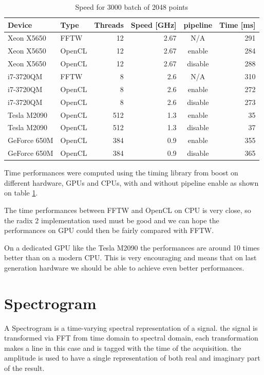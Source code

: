 	\begin{table}[H]
		\caption{Speed for 3000 batch of 2048 points}
		\centering
		\label{tab:speed}
		\begin{tabular}{|l|lrrcr|}
			\hline
				Device & Type & Threads & Speed [GHz] & pipeline & Time [ms] \\
			\hline
			\hline
				Xeon X5650 & FFTW & 12 & 2.67 & N/A & 291 \\
				Xeon X5650 & OpenCL & 12 & 2.67 & enable & 284 \\
				Xeon X5650 & OpenCL & 12 & 2.67 & disable & 288 \\
			\hline
				i7-3720QM & FFTW & 8 & 2.6 & N/A & 310 \\
				i7-3720QM & OpenCL & 8 & 2.6 & enable & 272 \\
				i7-3720QM & OpenCL & 8 & 2.6 & disable & 273 \\
			\hline
			\hline
				Tesla M2090 & OpenCL & 512 & 1.3 & enable & 35 \\
				Tesla M2090 & OpenCL & 512 & 1.3 & disable & 37 \\
			\hline
				GeForce 650M & OpenCL & 384 & 0.9 & enable & 355 \\
				GeForce 650M & OpenCL & 384 & 0.9 & disable & 365 \\
			\hline
		\end{tabular}
	\end{table}

	Time performances were computed using the timing library from boost \cite{boost} on different hardware, \glspl{GPU} and \glspl{CPU}, with and without pipeline enable as shown on table \ref{tab:speed}.

	The time performances between \gls{FFTW} and \gls{OpenCL} on \gls{CPU} is very close, so the radix 2 implementation used must be good and we can hope the performances on \gls{GPU} could then be fairly compared with \gls{FFTW}.

	On a dedicated \gls{GPU} like the Tesla M2090  the performances are around 10 times better than on a modern \gls{CPU}. This is very encouraging and means that on last generation hardware we should be able to achieve even better performances.
	
\section{Spectrogram}
\label{sec:spectrogram}

A Spectrogram is a time-varying spectral representation of a signal. the signal is transformed via \gls{FFT} from time domain to spectral domain, each transformation makes a line in this case and is tagged with the time of the acquisition. the amplitude is used to have a single representation of both real and imaginary part of the result.

